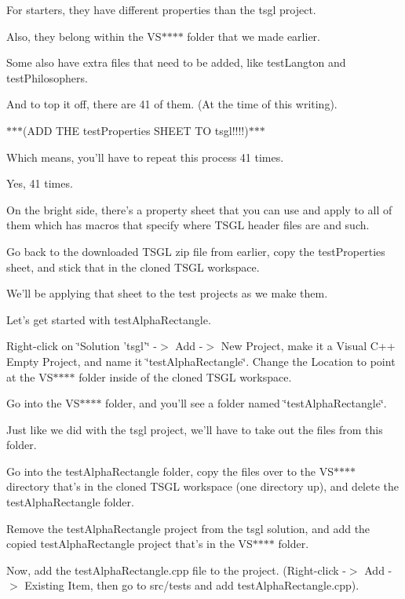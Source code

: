 For starters, they have different properties than the tsgl project.

Also, they belong within the V\-S$\ast$$\ast$$\ast$$\ast$ folder that we made earlier.

Some also have extra files that need to be added, like test\-Langton and test\-Philosophers.

And to top it off, there are 41 of them. (At the time of this writing).

$\ast$$\ast$$\ast$(A\-D\-D T\-H\-E test\-Properties S\-H\-E\-E\-T T\-O tsgl!!!!)$\ast$$\ast$$\ast$

Which means, you'll have to repeat this process 41 times.

Yes, 41 times.

On the bright side, there's a property sheet that you can use and apply to all of them which has macros that specify where T\-S\-G\-L header files are and such.

Go back to the downloaded T\-S\-G\-L zip file from earlier, copy the test\-Properties sheet, and stick that in the cloned T\-S\-G\-L workspace.

We'll be applying that sheet to the test projects as we make them.

Let's get started with test\-Alpha\-Rectangle.

Right-\/click on \char`\"{}\-Solution 'tsgl'\char`\"{} -\/$>$ Add -\/$>$ New Project, make it a Visual C++ Empty Project, and name it \char`\"{}test\-Alpha\-Rectangle\char`\"{}. Change the Location to point at the V\-S$\ast$$\ast$$\ast$$\ast$ folder inside of the cloned T\-S\-G\-L workspace.

Go into the V\-S$\ast$$\ast$$\ast$$\ast$ folder, and you'll see a folder named \char`\"{}test\-Alpha\-Rectangle\char`\"{}.

Just like we did with the tsgl project, we'll have to take out the files from this folder.

Go into the test\-Alpha\-Rectangle folder, copy the files over to the V\-S$\ast$$\ast$$\ast$$\ast$ directory that's in the cloned T\-S\-G\-L workspace (one directory up), and delete the test\-Alpha\-Rectangle folder.

Remove the test\-Alpha\-Rectangle project from the tsgl solution, and add the copied test\-Alpha\-Rectangle project that's in the V\-S$\ast$$\ast$$\ast$$\ast$ folder.

Now, add the test\-Alpha\-Rectangle.\-cpp file to the project. (Right-\/click -\/$>$ Add -\/$>$ Existing Item, then go to src/tests and add test\-Alpha\-Rectangle.\-cpp).

